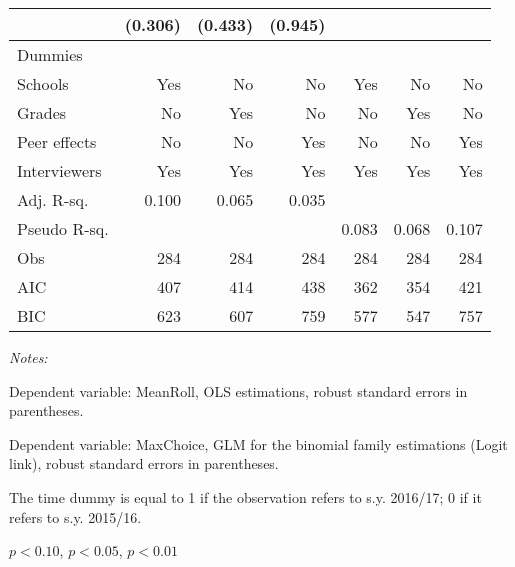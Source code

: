 \begin{table}[htbp]
\begin{adjustbox}{width=1\textwidth}
\begin{threeparttable}
\begin{tabular}{l*{6}{D{.}{.}{-1}}}
                    &             (0.306)   &             (0.433)   &             (0.945)   &                       &                       &                       \\ \midrule
Dummies &&&&&& \\
Schools             &                 Yes   &                  No   &                  No   &                 Yes   &                  No   &                  No   \\
Grades              &                  No   &                 Yes   &                  No   &                  No   &                 Yes   &                  No   \\
Peer effects        &                  No   &                  No   &                 Yes   &                  No   &                  No   &                 Yes   \\
Interviewers        &                 Yes   &                 Yes   &                 Yes   &                 Yes   &                 Yes   &                 Yes   \\
\midrule
Adj. R-sq.          &               0.100   &               0.065   &               0.035   &     	          &   	                &                 \\
Pseudo R-sq.        &                       &                       &       &     0.083	          &   0.068	                &           0.107 \\
Obs                 &                 284   &                 284   &                 284   &                 284   &                 284   &                 284   \\
AIC                 &                 407   &                 414   &                 438   &                 362   &                 354   &                 421   \\
BIC                 &                 623   &                 607   &                 759   &                 577   &                 547   &                 757   \\
\bottomrule
\end{tabular}
\begin{tablenotes}
\footnotesize
\item \textit{Notes:} 
\item[1] Dependent variable: MeanRoll, OLS estimations, robust standard errors in parentheses.
\item[2] Dependent variable: MaxChoice, GLM for the binomial family estimations (Logit link), robust standard errors in parentheses.
\item The time dummy is equal to 1 if the observation refers to s.y. 2016/17; 0 if it refers to s.y. 2015/16.
\item \sym{*} \(p<0.10\), \sym{**} \(p<0.05\), \sym{***} \(p<0.01\)
\end{tablenotes}
\end{threeparttable}
\end{adjustbox}
\label{tab:stability}
\end{table}
